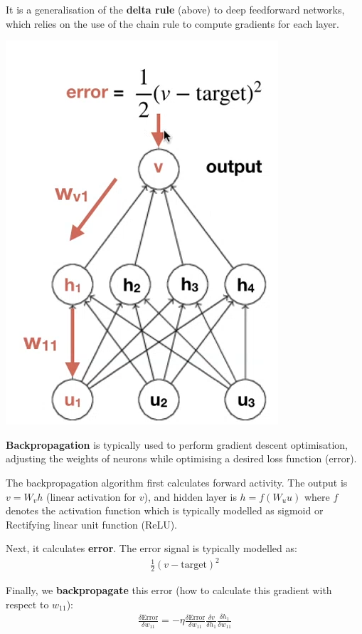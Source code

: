 \documentclass[11pt,a4paper,titlepage,dvipsnames,cmyk]{scrartcl}
\begin{document}
It is a generalisation of the \textbf{delta rule} (above) to deep feedforward networks, which relies on the use of the chain rule to compute gradients for each layer.

\begin{center}
\includegraphics[scale=.5]{pics/backprop.png}
\end{center}

\textbf{Backpropagation} is typically used to perform gradient descent optimisation, adjusting the weights of neurons while optimising a desired loss function (error).

The backpropagation algorithm first calculates forward activity. The output is $v = W_vh$ (linear activation for $v$), and hidden layer is $h=f(W_uu)$ where $f$ denotes the activation function which is typically modelled as sigmoid or Rectifying linear unit function (ReLU).

Next, it calculates \textbf{error}. The error signal is typically modelled as:
\begin{align*}
\frac{1}{2} (v- \text{target})^2
\end{align*}

Finally, we \textbf{backpropagate} this error (how to calculate this gradient with respect to $w_{11}$):
\begin{align*}
\frac{\delta \text{Error}}{\delta w_{11}} = - \eta \frac{\delta \text{Error}}{\delta w_{11}} \frac{\delta v}{\delta h_1} \frac{\delta h_1}{\delta w_{11}}
\end{align*}
\end{document}
